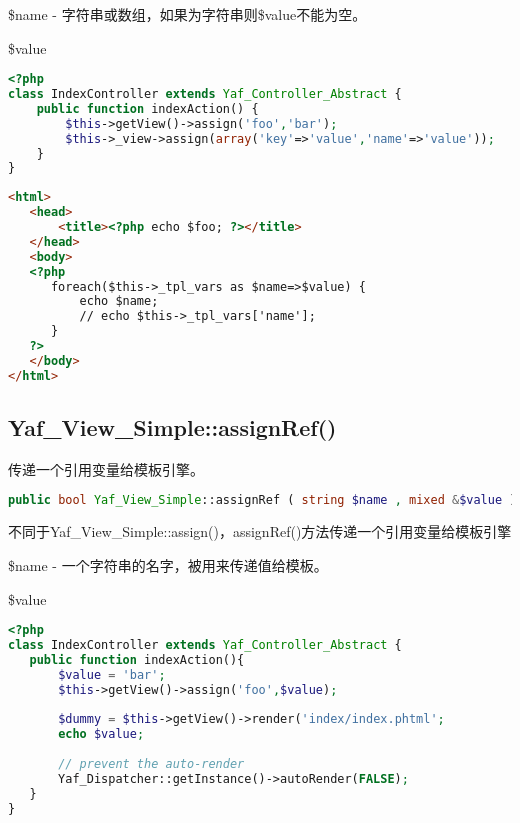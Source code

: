 \begin{compactitem}
\item \$name - 字符串或数组，如果为字符串则\$value不能为空。

\item \$value
\end{compactitem}



\begin{lstlisting}[language=PHP]
<?php
class IndexController extends Yaf_Controller_Abstract {
    public function indexAction() {
        $this->getView()->assign('foo','bar');
        $this->_view->assign(array('key'=>'value','name'=>'value'));
    }
}
\end{lstlisting}



\begin{lstlisting}[language=HTML]
<html>
   <head>
       <title><?php echo $foo; ?></title>
   </head>
   <body>
   <?php
      foreach($this->_tpl_vars as $name=>$value) {
          echo $name; 
          // echo $this->_tpl_vars['name'];
      }
   ?>
   </body>
</html>
\end{lstlisting}



\subsection{Yaf\_View\_Simple::assignRef()}

传递一个引用变量给模板引擎。

\begin{lstlisting}[language=PHP]
public bool Yaf_View_Simple::assignRef ( string $name , mixed &$value )
\end{lstlisting}

不同于Yaf\_View\_Simple::assign()，assignRef()方法传递一个引用变量给模板引擎


\begin{compactitem}
\item \$name - 一个字符串的名字，被用来传递值给模板。
\item \$value
\end{compactitem}



\begin{lstlisting}[language=PHP]
<?php
class IndexController extends Yaf_Controller_Abstract {
   public function indexAction(){
       $value = 'bar';
       $this->getView()->assign('foo',$value);
       
       $dummy = $this->getView()->render('index/index.phtml';
       echo $value;
       
       // prevent the auto-render
       Yaf_Dispatcher::getInstance()->autoRender(FALSE);
   }
}
\end{lstlisting}



